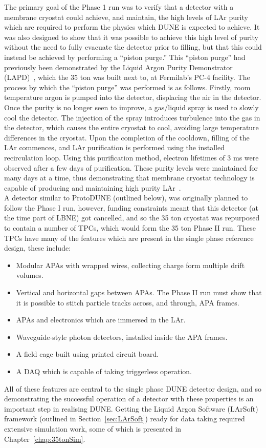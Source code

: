 The primary goal of the Phase 1 run was to verify that a detector with a membrane cryostat could achieve, and maintain, the high levels of LAr purity which are required to perform the physics which DUNE is expected to achieve. It was also designed to show that it was possible to achieve this high level of purity without the need to fully evacuate the detector prior to filling, but that this could instead be achieved by performing a ``piston purge.'' This ``piston purge'' had previously been demonstrated by the Liquid Argon Purity Demonstrator (LAPD)~\citep{LAPD}, which the 35 ton was built next to, at Fermilab's PC-4 facility. The process by which the ``piston purge'' was performed is as follows. Firstly, room temperature argon is pumped into the detector, displacing the air in the detector. Once the purity is no longer seen to improve, a gas/liquid spray is used to slowly cool the detector. The injection of the spray introduces turbulence into the gas in the detector, which causes the entire cryostat to cool, avoiding large temperature differences in the cryostat. Upon the completion of the cooldown, filling of the LAr commences, and LAr purification is performed using the installed recirculation loop. Using this purification method, electron lifetimes of 3 ms were observed after a few days of purification. These purity levels were maintained for many days at a time, thus demonstrating that membrane cryostat technology is capable of producing and maintaining high purity LAr~\citep{35tonMontanari, 35tonHahn}. \\

A detector similar to ProtoDUNE (outlined below), was originally planned to follow the Phase I run, however, funding constraints meant that this detector (at the time part of LBNE) got cancelled, and so the 35 ton cryostat was repurposed to contain a number of TPCs, which would form the 35 ton Phase II run. These TPCs have many of the features which are present in the single phase reference design, these include:
\begin{itemize}
\item Modular APAs with wrapped wires, collecting charge form multiple drift volumes.
\item Vertical and horizontal gaps between APAs. The Phase II run must show that it is possible to stitch particle tracks across, and through, APA frames.
\item APAs and electronics which are immersed in the LAr.
\item Waveguide-style photon detectors, installed inside the APA frames.
\item A field cage built using printed circuit board.
\item A DAQ which is capable of taking triggerless operation.
\end{itemize}
All of these features are central to the single phase DUNE detector design, and so demonstrating the successful operation of a detector with these properties is an important step in realising DUNE. Getting the Liquid Argon Software (LArSoft) framework (outlined in Section~\ref{sec:LArSoft}) ready for data taking required extensive simulation work, some of which is presented in Chapter~\ref{chap:35tonSim}. \\


